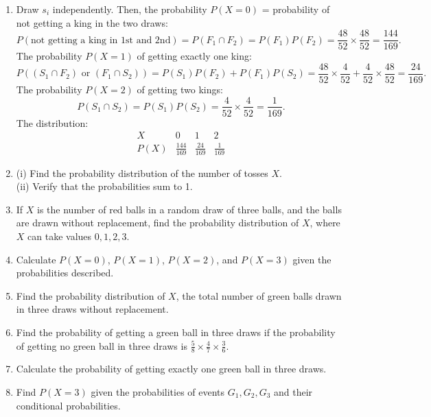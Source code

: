 \documentclass{article}
\begin{document}
\begin{enumerate}
    \item Draw \(s_i\) independently. Then, the probability \(P(X=0)\) = probability of not getting a king in the two draws:
    \[
    P(\text{not getting a king in 1st and 2nd}) = P(F_1 \cap F_2) = P(F_1) P(F_2) = \frac{48}{52} \times \frac{48}{52} = \frac{144}{169}.
    \]
    The probability \(P(X=1)\) of getting exactly one king:
    \[
    P((S_1 \cap F_2) \text{ or } (F_1 \cap S_2)) = P(S_1) P(F_2) + P(F_1) P(S_2) = \frac{48}{52} \times \frac{4}{52} + \frac{4}{52} \times \frac{48}{52} = \frac{24}{169}.
    \]
    The probability \(P(X=2)\) of getting two kings:
    \[
    P(S_1 \cap S_2) = P(S_1) P(S_2) = \frac{4}{52} \times \frac{4}{52} = \frac{1}{169}.
    \]
    The distribution:
    \[
    \begin{array}{c|c|c|c}
    X & 0 & 1 & 2 \\
    P(X) & \frac{144}{169} & \frac{24}{169} & \frac{1}{169}
    \end{array}
    \]
    
    \item (i) Find the probability distribution of the number of tosses \(X\). \\
    (ii) Verify that the probabilities sum to 1.
    
    \item If \(X\) is the number of red balls in a random draw of three balls, and the balls are drawn without replacement, find the probability distribution of \(X\), where \(X\) can take values \(0,1,2,3\).
    
    \item Calculate \(P(X=0)\), \(P(X=1)\), \(P(X=2)\), and \(P(X=3)\) given the probabilities described.
    
    \item Find the probability distribution of \(X\), the total number of green balls drawn in three draws without replacement.
    
    \item Find the probability of getting a green ball in three draws if the probability of getting no green ball in three draws is \(\frac{5}{8} \times \frac{4}{7} \times \frac{3}{6}\).
    
    \item Calculate the probability of getting exactly one green ball in three draws.
    
    \item Find \(P(X=3)\) given the probabilities of events \(G_1, G_2, G_3\) and their conditional probabilities.
    

\end{enumerate}
\end{document}
